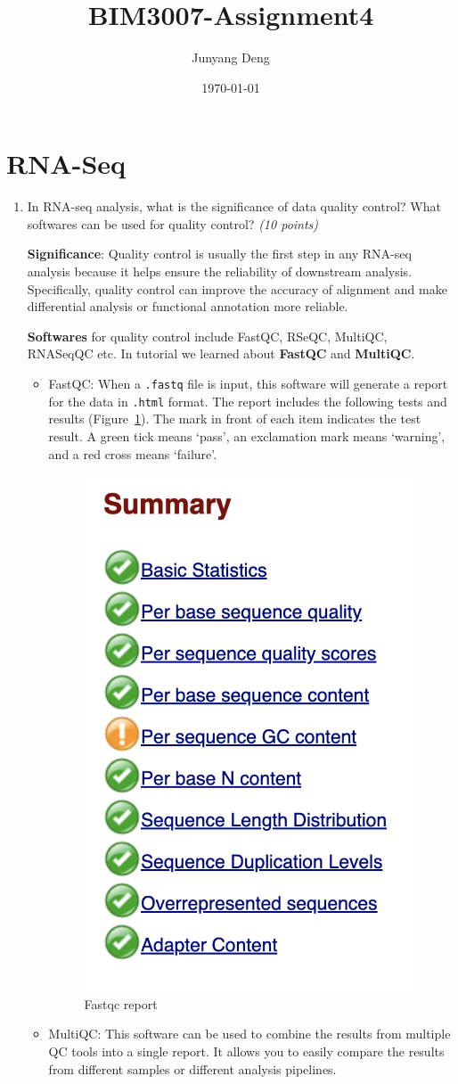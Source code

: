 \documentclass{article}
\title{BIM3007-Assignment4}
\author{Junyang Deng}
\date{\today}
\begin{document}
 
\maketitle
\section{RNA-Seq}
\begin{enumerate}
    \item In RNA-seq analysis, what is the significance of data quality control? What softwares can be used for quality control? \emph{(10 points)}
    
    \textbf{Significance}: Quality control is usually the first step in any RNA-seq analysis because it helps ensure the reliability of downstream analysis. Specifically, quality control can improve the accuracy of alignment and make differential analysis or functional annotation more reliable.

    \textbf{Softwares} for quality control include FastQC, RSeQC, MultiQC, RNASeqQC etc. In tutorial we learned about \textbf{FastQC} and \textbf{MultiQC}.
    
    \begin{itemize}
        \item FastQC: When a \texttt{.fastq} file is input, this software will generate a report for the data in \texttt{.html} format. The report includes the following tests and results (Figure~\ref{fig:fastqc}). The mark in front of each item indicates the test result. A green tick means `pass', an exclamation mark means `warning', and a red cross means `failure'.
    \begin{figure}[htbp]
        \centering
        \includegraphics[width=0.3\linewidth]{images/fastqc.png}
        \caption{Fastqc report}
        \label{fig:fastqc}
    \end{figure}
    \item MultiQC: This software can be used to combine the results from multiple QC tools into a single report. It allows you to easily compare the results from different samples or different analysis pipelines.
\end{itemize}


\end{enumerate}
\end{document}
